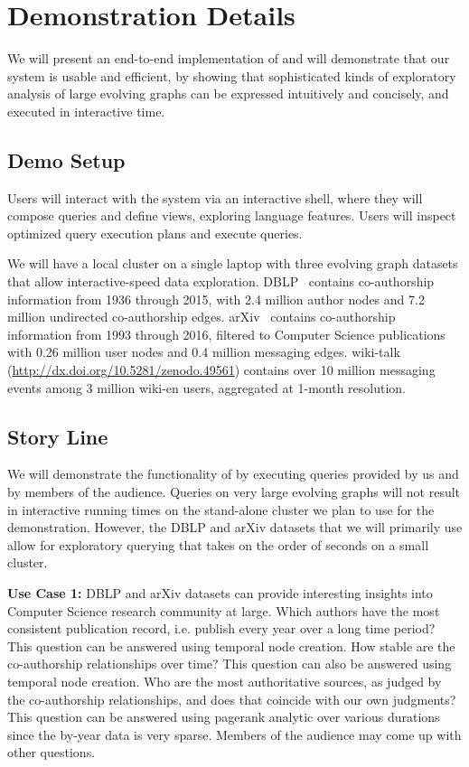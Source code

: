 \section{Demonstration Details}
\label{sec:demo}

We will present an end-to-end implementation of \ql and will
demonstrate that our system is usable and efficient, by showing that
sophisticated kinds of exploratory analysis of large evolving graphs
can be expressed intuitively and concisely, and executed in
interactive time.

\subsection{Demo Setup}
\label{sec:setup}

Users will interact with the \ql system via an interactive shell,
where they will compose queries and define \tg views, exploring
language features.  Users will inspect optimized query execution plans
and execute queries.

We will have a local cluster on a single laptop with three evolving
graph datasets that allow interactive-speed data
exploration. DBLP~\cite{dblp} contains co-authorship information from
1936 through 2015, with 2.4 million author nodes and 7.2 million
undirected co-authorship edges.  arXiv~\cite{arxiv} contains
co-authorship information from 1993 through 2016, filtered to Computer
Science publications with 0.26 million user nodes and 0.4 million
messaging edges.  wiki-talk
(\url{http://dx.doi.org/10.5281/zenodo.49561}) contains over 10
million messaging events among 3 million wiki-en users, aggregated at 1-month resolution.

\subsection{Story Line}
\label{sec:story}

We will demonstrate the functionality of \ql by executing queries
provided by us and by members of the audience. Queries on very large
evolving graphs will not result in interactive running times on the
stand-alone cluster we plan to use for the demonstration.  However,
the DBLP and arXiv datasets that we will primarily use allow for
exploratory querying that takes on the order of seconds on a small
cluster.

{\bf Use Case 1:} DBLP and arXiv datasets can provide interesting
insights into Computer Science research community at large.  Which
authors have the most consistent publication record, i.e. publish
every year over a long time period? This question can be answered
using temporal node creation.  How stable are the co-authorship
relationships over time? This question can also be answered using
temporal node creation.  Who are the most authoritative sources, as
judged by the co-authorship relationships, and does that coincide with
our own judgments?  This question can be answered using pagerank
analytic over various durations since the by-year data is very sparse.
Members of the audience may come up with other questions.

